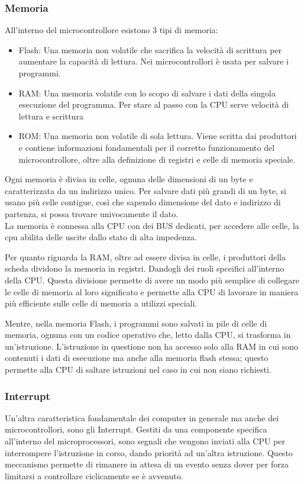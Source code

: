 \subsubsection{Memoria}
All'interno del microcontrollore esistono 3 tipi di memoria:
\begin{itemize}
    \item Flash: Una memoria non volatile che sacrifica la velocità di scrittura per aumentare la capacità di lettura. Nei microcontrollori è usata per salvare i programmi.
    \item RAM: Una memoria volatile con lo scopo di salvare i dati della singola esecuzione del programma. Per stare al passo con la CPU serve velocità di lettura e scrittura
    \item ROM: Una memoria non volatile di sola lettura. Viene scritta dai produttori e contiene informazioni fondamentali per il corretto funzionamento del microcontrollore, oltre alla definizione di registri e celle di memoria speciale.
\end{itemize}
Ogni memoria è divisa in celle, ognuna delle dimensioni di un byte e caratterizzata da un indirizzo unico. Per salvare dati più grandi di un byte, si usano più celle contigue, così che sapendo dimensione del dato e indirizzo di partenza, si possa trovare univocamente il dato.\\
La memoria è connessa alla CPU con dei BUS dedicati, per accedere alle celle, la cpu abilita delle uscite dallo stato di alta impedenza.

Per quanto riguarda la RAM, oltre ad essere divisa in celle, i produttori della scheda dividono la memoria in registri. Dandogli dei ruoli spceifici all'interno della CPU. Questa divisione permette di avere un modo più semplice di collegare le celle di memoria al loro significato e permette alla CPU di lavorare in maniera più efficiente sulle celle di memoria a utilizzi speciali.

Mentre, nella memoria Flash, i programmi sono salvati in pile di celle di memoria, ognuna con un codice operativo che, letto dalla CPU, si trasforma in un'istruzione. L'istruzione in questione non ha accesso solo alla RAM in cui sono contenuti i dati di esecuzione ma anche alla memoria flash stessa; questo permette alla CPU di saltare istruzioni nel caso in cui non siano richiesti.

\subsubsection{Interrupt}
Un'altra caratteristica fondamentale dei computer in generale ma anche dei microcontrollori, sono gli Interrupt. Gestiti da una componente specifica all'interno del microprocessori, sono segnali che vengono inviati alla CPU per interrompere l'istruzione in corso, dando priorità ad un'altra istruzione. Questo meccanismo permette di rimanere in attesa di un evento senza dover per forza limitarsi a controllare ciclicamente se è avvenuto.\\

